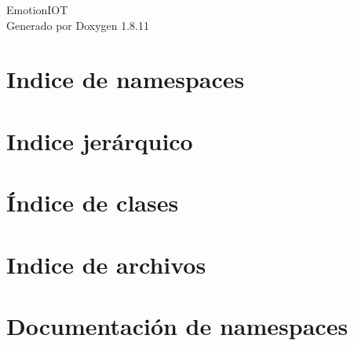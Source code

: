 \documentclass[twoside]{book}
\newcommand{\+}{\discretionary{\mbox{\scriptsize$\hookleftarrow$}}{}{}}
\newcommand{\clearemptydoublepage}{%
  \newpage{\pagestyle{empty}\cleardoublepage}%
}
\begin{document}
\hypersetup{pageanchor=false,
             bookmarksnumbered=true,
             pdfencoding=unicode
            }
\begin{titlepage}
\vspace*{7cm}
\begin{center}%
{\Large Emotion\+I\+OT }\\
\vspace*{1cm}
{\large Generado por Doxygen 1.8.11}\\
\end{center}
\end{titlepage}
\clearemptydoublepage
\tableofcontents
\clearemptydoublepage
{}
\hypersetup{pageanchor=true}

\chapter{Indice de namespaces}

\chapter{Indice jerárquico}

\chapter{Índice de clases}

\chapter{Indice de archivos}

\chapter{Documentación de namespaces}







\end{document}

